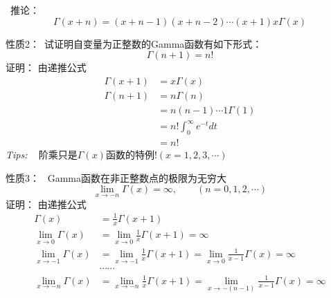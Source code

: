 \begin{frame}
	 推论： 
	\begin{equation*}
		\Gamma(x+n)=(x+n-1)(x+n-2)\cdots (x+1)x\Gamma(x)
	\end{equation*}	 \vspace{2cm}
\end{frame}	

\begin{frame}
	\alert{性质2：}~试证明自变量为正整数的Gamma函数有如下形式：
	\begin{equation*}
		\Gamma(n+1)=n!
	\end{equation*}	
	\alert{证明：}  由递推公式
	\begin{equation*}
	\begin{split}
		\Gamma(x+1)&=x \Gamma(x) \\
		\Gamma(n+1)&=n \Gamma(n) \\
		&=n(n-1)\cdots 1 \Gamma(1) \\
		&=n! \int_{0}^{\infty}  e^{-t} dt \\
		&=n!
	\end{split}
	\end{equation*}	
\alert{\textit{Tips:\hspace{1em}}} ~ 阶乘只是$\Gamma(x)$函数的特例!$(x=1,2,3,\cdots)$
\end{frame}	

\begin{frame}
	\alert{性质3：} ~Gamma函数在非正整数点的极限为无穷大
	\begin{equation*}
		\lim\limits_{x\to -n }\Gamma(x)=\infty, \qquad (n=0,1,2, \cdots)
	\end{equation*}	
	\alert{证明：}  由递推公式
	\begin{equation*}
	\begin{split}
		\Gamma(x)&=\frac{1}{x} \Gamma(x+1) \\
		\lim\limits_{x\to 0 }	\Gamma(x)&=	\lim\limits_{x\to 0 } \frac{1}{x} \Gamma(x+1) =\infty \\
		\lim\limits_{x\to -1 }	\Gamma(x)&=\lim\limits_{x\to -1 } \frac{1}{x} \Gamma(x+1) =  \lim\limits_{x\to 0 } \frac{1}{x-1} \Gamma(x) =\infty \\
		& \cdots \cdots \\
		\lim\limits_{x\to -n }	\Gamma(x)&=\lim\limits_{x\to -n } \frac{1}{x} \Gamma(x+1) = \lim\limits_{x\to -(n-1) } \frac{1}{x-1} \Gamma(x) =\infty \\
	\end{split}
	\end{equation*}	
\end{frame}	

